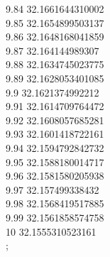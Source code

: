 {9.84	32.1661644310002\\
9.85	32.1654899503137\\
9.86	32.1648168041859\\
9.87	32.164144989307\\
9.88	32.1634745023775\\
9.89	32.1628053401085\\
9.9	32.1621374992212\\
9.91	32.1614709764472\\
9.92	32.1608057685281\\
9.93	32.1601418722161\\
9.94	32.1594792842732\\
9.95	32.1588180014717\\
9.96	32.1581580205938\\
9.97	32.157499338432\\
9.98	32.1568419517885\\
9.99	32.1561858574758\\
10	32.1555310523161\\
};

